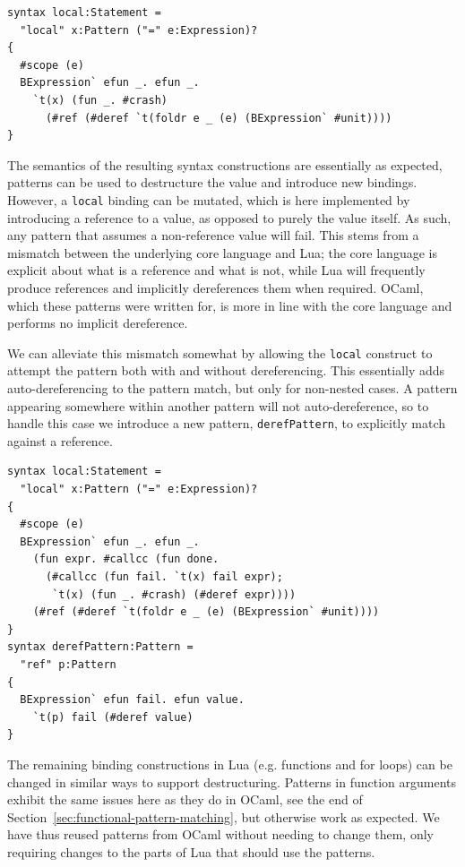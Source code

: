 \documentclass{kththesis}
\begin{document}
\begin{verbatim}
syntax local:Statement =
  "local" x:Pattern ("=" e:Expression)?
{
  #scope (e)
  BExpression` efun _. efun _.
    `t(x) (fun _. #crash)
      (#ref (#deref `t(foldr e _ (e) (BExpression` #unit))))
}
\end{verbatim}

The semantics of the resulting syntax constructions are essentially as expected, patterns can be used to destructure the value and introduce new bindings. However, a \texttt{local} binding can be mutated, which is here implemented by introducing a reference to a value, as opposed to purely the value itself. As such, any pattern that assumes a non-reference value will fail. This stems from a mismatch between the underlying core language and Lua; the core language is explicit about what is a reference and what is not, while Lua will frequently produce references and implicitly dereferences them when required. OCaml, which these patterns were written for, is more in line with the core language and performs no implicit dereference.

We can alleviate this mismatch somewhat by allowing the \texttt{local} construct to attempt the pattern both with and without dereferencing. This essentially adds auto-dereferencing to the pattern match, but only for non-nested cases. A pattern appearing somewhere within another pattern will not auto-dereference, so to handle this case we introduce a new pattern, \texttt{derefPattern}, to explicitly match against a reference.

\begin{verbatim}
syntax local:Statement =
  "local" x:Pattern ("=" e:Expression)?
{
  #scope (e)
  BExpression` efun _. efun _.
    (fun expr. #callcc (fun done.
      (#callcc (fun fail. `t(x) fail expr);
       `t(x) (fun _. #crash) (#deref expr))))
    (#ref (#deref `t(foldr e _ (e) (BExpression` #unit))))
}
syntax derefPattern:Pattern =
  "ref" p:Pattern
{
  BExpression` efun fail. efun value.
    `t(p) fail (#deref value)
}
\end{verbatim}

The remaining binding constructions in Lua (e.g. functions and for loops) can be changed in similar ways to support destructuring. Patterns in function arguments exhibit the same issues here as they do in OCaml, see the end of Section~\ref{sec:functional-pattern-matching}, but otherwise work as expected. We have thus reused patterns from OCaml without needing to change them, only requiring changes to the parts of Lua that should use the patterns.
\end{document}
